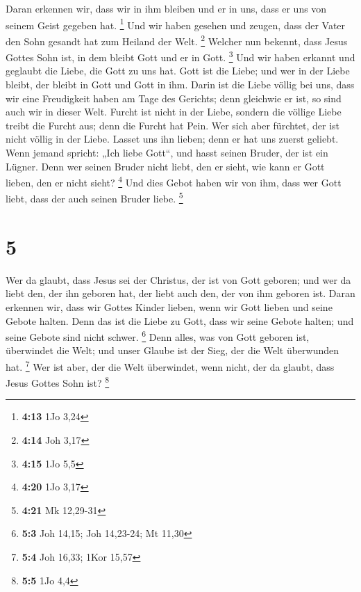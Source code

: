 Daran erkennen wir, dass wir in ihm bleiben und er in uns,
dass er uns von seinem Geist gegeben hat. \footnote{\textbf{4:13} 1Jo
  3,24}  Und wir haben gesehen und zeugen, dass der Vater
den Sohn gesandt hat zum Heiland der Welt. \footnote{\textbf{4:14} Joh
  3,17}  Welcher nun bekennt, dass Jesus Gottes Sohn ist,
in dem bleibt Gott und er in Gott. \footnote{\textbf{4:15} 1Jo 5,5}
 Und wir haben erkannt und geglaubt die Liebe, die Gott zu
uns hat. Gott ist die Liebe; und wer in der Liebe bleibt, der bleibt in
Gott und Gott in ihm.  Darin ist die Liebe völlig bei uns,
dass wir eine Freudigkeit haben am Tage des Gerichts; denn gleichwie er
ist, so sind auch wir in dieser Welt.  Furcht ist nicht in
der Liebe, sondern die völlige Liebe treibt die Furcht aus; denn die
Furcht hat Pein. Wer sich aber fürchtet, der ist nicht völlig in der
Liebe.  Lasset uns ihn lieben; denn er hat uns zuerst
geliebt.  Wenn jemand spricht: „Ich liebe Gott``, und hasst
seinen Bruder, der ist ein Lügner. Denn wer seinen Bruder nicht liebt,
den er sieht, wie kann er Gott lieben, den er nicht sieht? \footnote{\textbf{4:20}
  1Jo 3,17}  Und dies Gebot haben wir von ihm, dass wer
Gott liebt, dass der auch seinen Bruder liebe. \footnote{\textbf{4:21}
  Mk 12,29-31}

\hypertarget{section-4}{%
\section{5}\label{section-4}}

 Wer da glaubt, dass Jesus sei der Christus, der ist von
Gott geboren; und wer da liebt den, der ihn geboren hat, der liebt auch
den, der von ihm geboren ist.  Daran erkennen wir, dass wir
Gottes Kinder lieben, wenn wir Gott lieben und seine Gebote halten.
 Denn das ist die Liebe zu Gott, dass wir seine Gebote
halten; und seine Gebote sind nicht schwer. \footnote{\textbf{5:3} Joh
  14,15; Joh 14,23-24; Mt 11,30}  Denn alles, was von Gott
geboren ist, überwindet die Welt; und unser Glaube ist der Sieg, der die
Welt überwunden hat. \footnote{\textbf{5:4} Joh 16,33; 1Kor 15,57}
 Wer ist aber, der die Welt überwindet, wenn nicht, der da
glaubt, dass Jesus Gottes Sohn ist? \footnote{\textbf{5:5} 1Jo 4,4}

